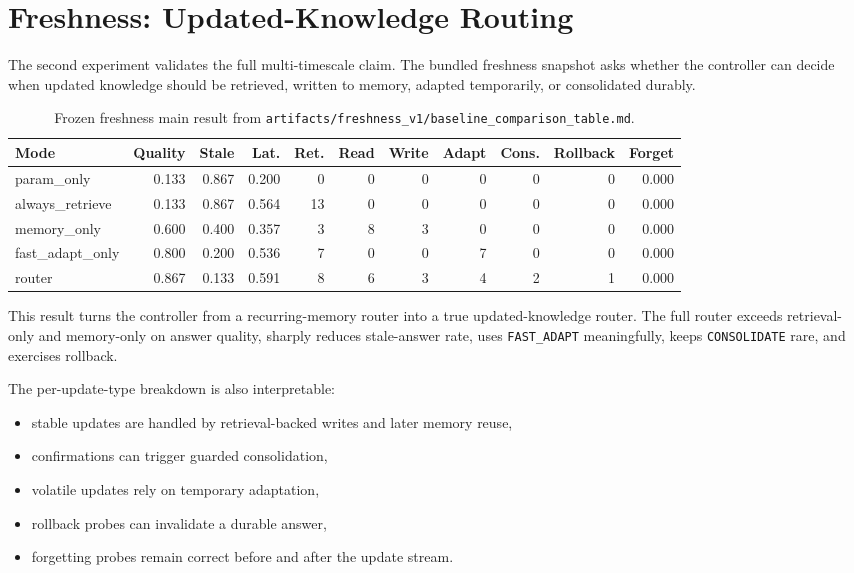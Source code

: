 \section{Freshness: Updated-Knowledge Routing}

The second experiment validates the full multi-timescale claim. The bundled freshness snapshot asks whether the controller can decide when updated knowledge should be retrieved, written to memory, adapted temporarily, or consolidated durably.

\begin{table}[t]
\centering
\small
\begin{tabular}{lrrrrrrrrrr}
\toprule
Mode & Quality & Stale & Lat. & Ret. & Read & Write & Adapt & Cons. & Rollback & Forget \\
\midrule
param\_only & 0.133 & 0.867 & 0.200 & 0 & 0 & 0 & 0 & 0 & 0 & 0.000 \\
always\_retrieve & 0.133 & 0.867 & 0.564 & 13 & 0 & 0 & 0 & 0 & 0 & 0.000 \\
memory\_only & 0.600 & 0.400 & 0.357 & 3 & 8 & 3 & 0 & 0 & 0 & 0.000 \\
fast\_adapt\_only & 0.800 & 0.200 & 0.536 & 7 & 0 & 0 & 7 & 0 & 0 & 0.000 \\
router & 0.867 & 0.133 & 0.591 & 8 & 6 & 3 & 4 & 2 & 1 & 0.000 \\
\bottomrule
\end{tabular}
\caption{Frozen freshness main result from \texttt{artifacts/freshness\_v1/baseline\_comparison\_table.md}.}
\end{table}

This result turns the controller from a recurring-memory router into a true updated-knowledge router. The full router exceeds retrieval-only and memory-only on answer quality, sharply reduces stale-answer rate, uses \texttt{FAST\_ADAPT} meaningfully, keeps \texttt{CONSOLIDATE} rare, and exercises rollback.

The per-update-type breakdown is also interpretable:
\begin{itemize}[leftmargin=1.5em]
\item stable updates are handled by retrieval-backed writes and later memory reuse,
\item confirmations can trigger guarded consolidation,
\item volatile updates rely on temporary adaptation,
\item rollback probes can invalidate a durable answer,
\item forgetting probes remain correct before and after the update stream.
\end{itemize}

